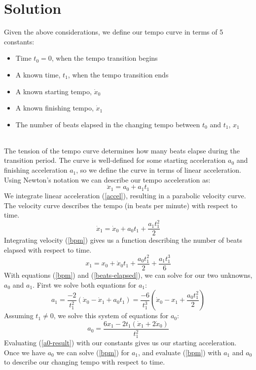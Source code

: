 \section{Solution}
\label{sec:polytempic-solution}
Given the above considerations, we define our tempo curve in terms of
5 constants:
\\[5mm]
\begin{fullwidth}
\begin{itemize}
  \item Time $t_0=0$, when the tempo transition begins
  \item A known time, $t_1$, when the tempo transition ends
  \item A known starting tempo, $\dot{x}_0$
  \item A known finishing tempo, $\dot{x}_1$
  \item The number of beats elapsed in the changing tempo between $t_0$ and $t_1$, $x_1$
\end{itemize}
\end{fullwidth}
\\[5mm]
The tension of the tempo curve determines how many beats elapse during 
the transition period. The curve is well-defined for some starting 
acceleration $a_0$ and finishing acceleration $a_1$, so we define the curve 
in terms of linear acceleration. Using Newton's notation we can describe our 
tempo acceleration as:
\begin{equation}
	\label{accel}
    \ddot{x}_1 = a_0 + a_1t_1
\end{equation}
We integrate linear acceleration (\ref{accel}), resulting in a parabolic 
velocity curve. The velocity curve describes the tempo (in beats per minute) 
with respect to time.
\begin{equation}
	\label{bpm}
    \dot{x}_1 = \dot{x}_0 + a_0t_1 + \frac{a_1t_1^2}{2}
\end{equation}
Integrating velocity (\ref{bpm}) gives us a function describing the number 
of beats elapsed with respect to time.
\begin{equation}
	\label{beats-elapsed}
	x_1 = x_0 + \dot{x}_0t_1 + \frac{a_0t_1^2}{2} + \frac{a_1t_1^3}{6}
\end{equation}
With equations (\ref{bpm}) and (\ref{beats-elapsed}), we can solve for our 
two unknowns, $a_0$ and $a_1$. First we solve both equations for $a_1$:
\begin{displaymath}
    \label{a1-solution}
    a_1=
    \frac{-2}{t_1^2}(\dot{x}_0-\dot{x}_1 + a_0t_1)=
    \frac{-6}{t_1^3}(\dot{x}_0-x_1 + \frac{a_0t_1^2}{2})
\end{displaymath}
Assuming $t_1 \neq 0$, we solve this system of equations for $a_0$:
\begin{equation}
	\label{a0-result}
	a_0=\frac{6x_1-2t_1(\dot{x}_1+2\dot{x}_0)}{t_1^2}
\end{equation}
Evaluating (\ref{a0-result}) with our constants gives us our starting
acceleration. Once we have $a_0$ we can solve (\ref{bpm}) for $a_1$, and 
evaluate (\ref{bpm}) with $a_1$ and $a_0$ to describe our changing tempo 
with respect to time.

